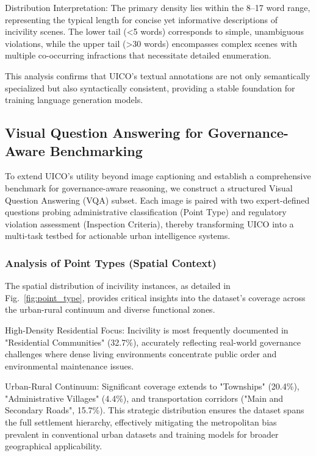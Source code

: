 \documentclass[lettersize,journal]{IEEEtran}
\begin{document}
	Distribution Interpretation: The primary density lies within the 8–17 word range, representing the typical length for concise yet informative descriptions of incivility scenes. The lower tail (<5 words) corresponds to simple, unambiguous violations, while the upper tail (>30 words) encompasses complex scenes with multiple co-occurring infractions that necessitate detailed enumeration.
	
	This analysis confirms that UICO's textual annotations are not only semantically specialized but also syntactically consistent, providing a stable foundation for training language generation models.
	
	\subsection{Visual Question Answering for Governance-Aware Benchmarking}
	
	To extend UICO's utility beyond image captioning and establish a comprehensive benchmark for governance-aware reasoning, we construct a structured Visual Question Answering (VQA) subset. Each image is paired with two expert-defined questions probing administrative classification (Point Type) and regulatory violation assessment (Inspection Criteria), thereby transforming UICO into a multi-task testbed for actionable urban intelligence systems.
	
	\subsubsection{Analysis of Point Types (Spatial Context)}
	The spatial distribution of incivility instances, as detailed in  Fig.~\ref{fig:point_type}, provides critical insights into the dataset's coverage across the urban-rural continuum and diverse functional zones.
	
	High-Density Residential Focus: Incivility is most frequently documented in "Residential Communities" (32.7\%), accurately reflecting real-world governance challenges where dense living environments concentrate public order and environmental maintenance issues.
	
	Urban-Rural Continuum: Significant coverage extends to "Townships" (20.4\%), "Administrative Villages" (4.4\%), and transportation corridors ("Main and Secondary Roads", 15.7\%). This strategic distribution ensures the dataset spans the full settlement hierarchy, effectively mitigating the metropolitan bias prevalent in conventional urban datasets and training models for broader geographical applicability.
	
\end{document}
